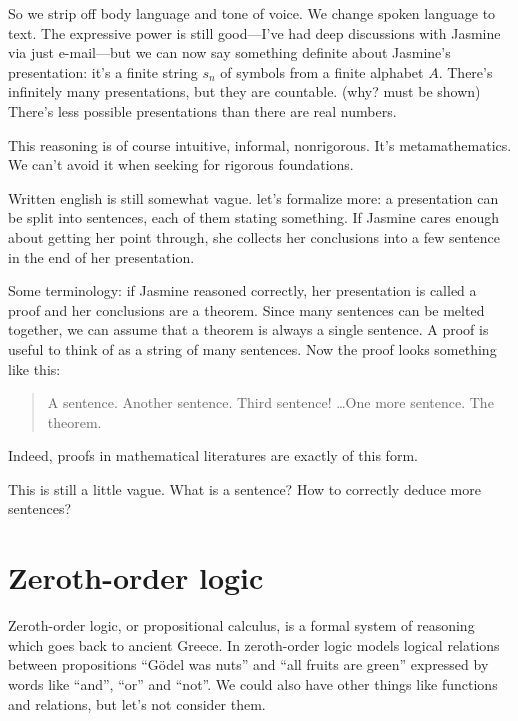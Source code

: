\documentclass[11pt,oneside,%
]{memoir}
\theoremstyle{definition}
\begin{document}
So we strip off body language and tone of voice. We change spoken language to text. The expressive power is still good---I've had deep discussions with Jasmine via just e-mail---but we can now say something definite about Jasmine's presentation: it's a finite string \(s_n\) of symbols from a finite alphabet \(A\). There's infinitely many presentations, but they are countable. (why? must be shown) There's less possible presentations than there are real numbers.

This reasoning is of course intuitive, informal, nonrigorous. It's metamathematics. We can't avoid it when seeking for rigorous foundations.

Written english is still somewhat vague. let's formalize more: a presentation can be split into sentences, each of them stating something. If Jasmine cares enough about getting her point through, she collects her conclusions into a few sentence in the end of her presentation.

Some terminology: if Jasmine reasoned correctly, her presentation is called a proof and her conclusions are a theorem. Since many sentences can be melted together, we can assume that a theorem is always a single sentence. A proof is useful to think of as a string of many sentences. Now the proof looks something like this:
\begin{quote}
A sentence. Another sentence. Third sentence! \ldots One more sentence. The theorem.
\end{quote}
Indeed, proofs in mathematical literatures are exactly of this form.

This is still a little vague. What is a sentence? How to correctly deduce more sentences?%

\section{Zeroth-order logic}

Zeroth-order logic, or propositional calculus, is a formal system of reasoning which goes back to ancient Greece. In zeroth-order logic models logical relations between propositions ``Gödel was nuts'' and ``all fruits are green'' expressed by words like ``and'', ``or'' and ``not''. We could also have other things like functions and relations, but let's not consider them.
\end{document}

